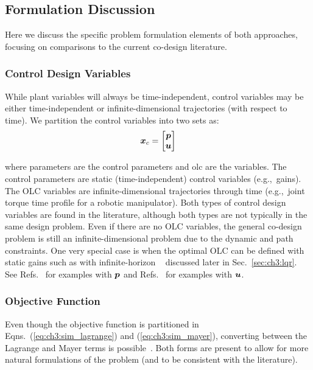 \subsection{Formulation Discussion\label{sec:ch3:form_dis}}

Here we  discuss the specific problem formulation elements of both approaches, focusing on comparisons to the current co-design literature.

\subsubsection{Control Design Variables}

While plant variables will always be time-independent, control variables may be either time-independent or infinite-dimensional trajectories (with respect to time). We partition the control variables into two sets as:
\begin{align}
\bm{x}_c = \begin{bmatrix} \bm{p} \\ \bm{u} \end{bmatrix}
\end{align}

\noindent where \gls{parameters} are the control parameters and \gls{olc} are the  variables.
The control parameters are static (time-independent) control variables (e.g.,~gains).
The OLC variables are infinite-dimensional trajectories through time (e.g.,~joint torque time profile for a robotic manipulator).
Both types of control design variables are found in the literature, although both types are not typically in the same design problem.
Even if there are no OLC variables, the general co-design problem is still an infinite-dimensional problem due to the dynamic and path constraints.
One very special case is when the optimal OLC can be defined with static gains such as with infinite-horizon ~\cite{Liberzon2012a, Belvin1990a, Rao1988a} discussed later in Sec.~\ref{sec:ch3:lqr}.
See Refs.~\cite{Belvin1990a, Eastep1987a, Fathy2003a, Rao1988a, Sunar1993a, Yan2009a} for examples with $\bm{p}$ and Refs.~\cite{Allison2014b, Deshmukh2016a, Herber2013a, Maraniello2016a, Chilan2017a} for examples with $\bm{u}$.

\subsubsection{Objective Function} 

Even though the objective function  is partitioned in Eqns.~(\ref{eq:ch3:sim_lagrange}) and (\ref{eq:ch3:sim_mayer}), converting between the Lagrange and Mayer terms is possible~\cite{Liberzon2012a, Herber2014a}. Both forms are present to allow for more natural formulations of the problem (and to be consistent with the literature).

